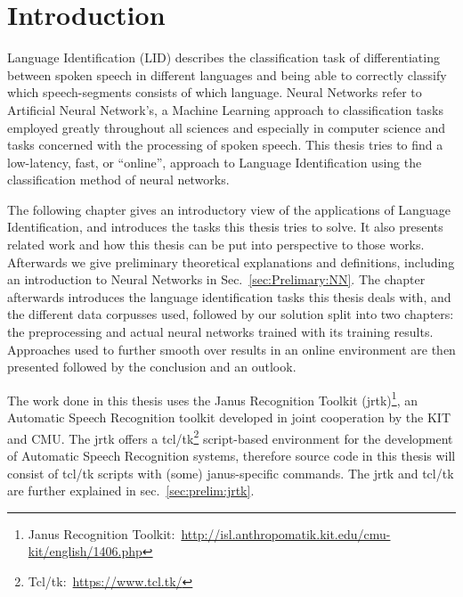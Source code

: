 
\chapter{Introduction}
\label{ch:Introduction}
Language Identification (LID) describes the classification task of differentiating between spoken speech in different languages and being able to correctly classify which speech-segments consists of which language.  Neural Networks refer to Artificial Neural Network's, a Machine Learning approach to classification tasks employed greatly throughout all sciences and especially in computer science and tasks concerned with the processing of spoken speech. This thesis tries to find a low-latency, fast, or ``online'', approach to Language Identification using the classification method of neural networks.

The following chapter gives an introductory view of the applications of Language Identification, and introduces the tasks this thesis tries to solve. It also presents related work and how this thesis can be put into perspective to those works. Afterwards we give preliminary theoretical explanations and definitions, including an introduction to Neural Networks in Sec.~\ref{sec:Prelimary:NN}. The chapter afterwards introduces the language identification tasks this thesis deals with, and the different data corpusses used, followed by our solution split into two chapters: the preprocessing and actual neural networks trained with its training results. Approaches used to further smooth over results in an online environment are then presented followed by the conclusion and an outlook.

The work done in this thesis uses the Janus Recognition Toolkit (jrtk)\footnote{Janus Recognition Toolkit:~\url{http://isl.anthropomatik.kit.edu/cmu-kit/english/1406.php}}, an Automatic Speech Recognition toolkit developed in joint cooperation by the KIT and CMU. The jrtk offers a tcl/tk\footnote{Tcl/tk:~\url{https://www.tcl.tk/}} script-based environment for the development of Automatic Speech Recognition systems, therefore source code in this thesis will consist of tcl/tk scripts with (some) janus-specific commands. The jrtk and tcl/tk are further explained in sec.~\ref{sec:prelim:jrtk}.

